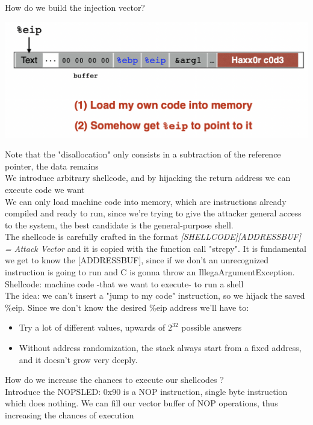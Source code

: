 \documentclass[11pt, oneside]{article}   	%
\begin{document}
How do we build the injection vector?
\begin{center}
\includegraphics[scale = 0.4]{injcode}
\end{center}
{\footnotesize Note that the "disallocation" only consists in a subtraction of the reference pointer, the data remains\\
We introduce arbitrary shellcode, and by hijacking the return address we can execute code we want}\\
We can only load machine code into memory, which are instructions already compiled and ready to run, since we're trying to give the attacker general access to the system, the best candidate is the general-purpose shell. \\The shellcode is carefully crafted in the format \emph{[SHELLCODE][ADDRESSBUF] = Attack Vector} and it is copied with the function call "strcpy".
It is fundamental we get to know the [ADDRESSBUF], since if we don't an unrecognized instruction is going to run and C is gonna throw an IllegaArgumentException.\\
{\footnotesize Shellcode: machine code -that we want to execute- to run a shell}\\
The idea: we can't insert a "jump to my code" instruction, so we hijack the saved \%eip. Since we don't know the desired \%eip address we'll have to:\begin{itemize}
\item Try a lot of different values, upwards of $2^{32}$ possible answers\\
\item Without address randomization, the stack always start from a fixed address, and it doesn't grow very deeply.
\end{itemize}
How do we increase the chances to execute our shellcodes ?\\
Introduce the NOPSLED: 0x90 is a NOP instruction, single byte instruction which does nothing.
We can fill our vector buffer of NOP operations, thus increasing the chances of execution
\end{document}
